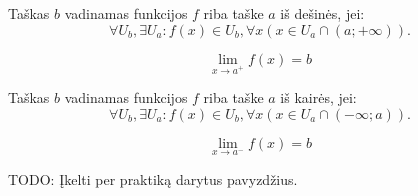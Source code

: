 \begin{defn}
  Taškas $b$ vadinamas funkcijos $f$ riba taške $a$ iš dešinės, jei:
  \[
  \forall U_{b}, \exists U_{a} :%
    f(x) \in U_{b}, \forall x (x \in U_{a} \cap (a; +\infty)).
  \]
  \begin{notation} 
    \[
    \lim _{x \to a^{+}} f(x) = b
    \]
  \end{notation}
\end{defn}

\begin{defn}
  Taškas $b$ vadinamas funkcijos $f$ riba taške $a$ iš kairės, jei:
  \[
  \forall U_{b}, \exists U_{a} :%
    f(x) \in U_{b}, \forall x (x \in U_{a} \cap (-\infty; a)).
  \]
  \begin{notation} 
    \[
    \lim _{x \to a^{-}} f(x) = b
    \]
  \end{notation}
\end{defn}

TODO: Įkelti per praktiką darytus pavyzdžius.
